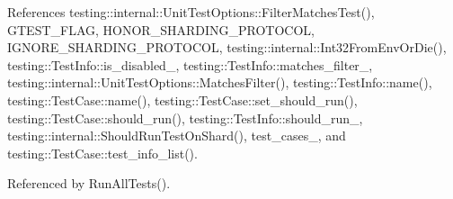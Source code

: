 References testing\+::internal\+::\+Unit\+Test\+Options\+::\+Filter\+Matches\+Test(), G\+T\+E\+S\+T\+\_\+\+F\+L\+AG, H\+O\+N\+O\+R\+\_\+\+S\+H\+A\+R\+D\+I\+N\+G\+\_\+\+P\+R\+O\+T\+O\+C\+OL, I\+G\+N\+O\+R\+E\+\_\+\+S\+H\+A\+R\+D\+I\+N\+G\+\_\+\+P\+R\+O\+T\+O\+C\+OL, testing\+::internal\+::\+Int32\+From\+Env\+Or\+Die(), testing\+::\+Test\+Info\+::is\+\_\+disabled\+\_\+, testing\+::\+Test\+Info\+::matches\+\_\+filter\+\_\+, testing\+::internal\+::\+Unit\+Test\+Options\+::\+Matches\+Filter(), testing\+::\+Test\+Info\+::name(), testing\+::\+Test\+Case\+::name(), testing\+::\+Test\+Case\+::set\+\_\+should\+\_\+run(), testing\+::\+Test\+Case\+::should\+\_\+run(), testing\+::\+Test\+Info\+::should\+\_\+run\+\_\+, testing\+::internal\+::\+Should\+Run\+Test\+On\+Shard(), test\+\_\+cases\+\_\+, and testing\+::\+Test\+Case\+::test\+\_\+info\+\_\+list().



Referenced by Run\+All\+Tests().


